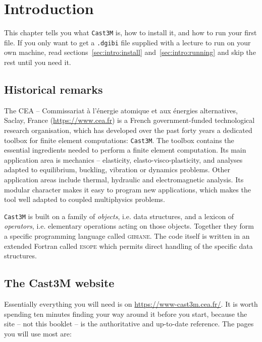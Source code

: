 \chapter{Introduction}
\label{chap:introduction}


This chapter tells you what \texttt{Cast3M} is, how to install it, and how to
run your first file. If you only want to get a \texttt{.dgibi} file supplied
with a lecture to run on your own machine, read
sections~\ref{sec:intro:install} and~\ref{sec:intro:running} and skip the rest
until you need it.

\section{Historical remarks}

The CEA -- Commissariat à l'énergie atomique et aux énergies alternatives,
Saclay, France (\url{https://www.cea.fr}) is a French government-funded
technological research organisation, which has developed over the past forty
years a dedicated toolbox for finite element computations: \texttt{Cast3M}.
The toolbox contains the essential ingredients needed to perform a finite
element computation. Its main application area is mechanics -- elasticity,
elasto-visco-plasticity, and analyses adapted to equilibrium, buckling,
vibration or dynamics problems. Other application areas include thermal,
hydraulic and electromagnetic analysis. Its modular character makes it easy to
program new applications, which makes the tool well adapted to coupled
multiphysics problems.

\texttt{Cast3M} is built on a family of \emph{objects}, i.e. data structures,
and a lexicon of \emph{operators}, i.e. elementary operations acting on those
objects. Together they form a specific programming language called
\textsc{gibiane}. The code itself is written in an extended Fortran called
\textsc{esope} which permits direct handling of the specific data structures.

\section{The Cast3M website}
\label{sec:intro:website}

Essentially everything you will need is on
\url{https://www-cast3m.cea.fr/}. It is worth spending ten minutes finding
your way around it before you start, because the site -- not this booklet --
is the authoritative and up-to-date reference. The pages you will use most
are:

